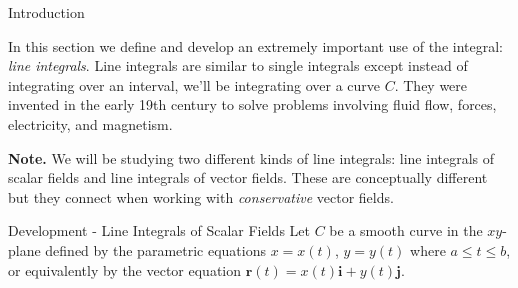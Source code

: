 \documentclass[11pt,english,
handout
]{beamer}
\begin{document}


\makebeamertitle










\begin{frame}{Introduction}

In this section we define and develop an extremely important use of the integral: \textit{line integrals}. Line integrals are similar to single integrals except instead of integrating over an interval, we'll be integrating over a curve $C$. They were invented in the early 19th century to solve problems involving fluid flow, forces, electricity, and magnetism.

\lspace
\textbf{Note.} We will be studying two different kinds of line integrals: line integrals of scalar fields and line integrals of vector fields. These are conceptually different but they connect when working with \textit{conservative} vector fields.
\end{frame}







\begin{frame}[t]{Development - Line Integrals of Scalar Fields}
\small
Let $C$ be a smooth curve in the $xy$-plane defined by the parametric equations $x=x(t)$, $y=y(t)$ where $a\leq t\leq b$, or equivalently by the vector equation $\mathbf{r}(t)=x(t)\mathbf{i}+y(t)\mathbf{j}$.  
\end{frame}
\end{document}
